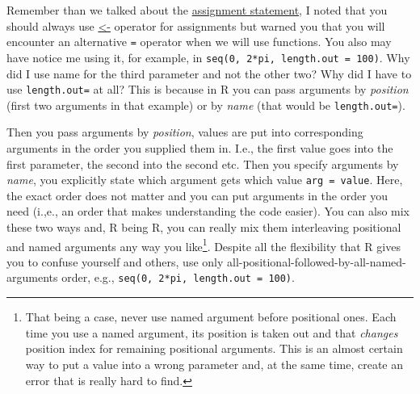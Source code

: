 \documentclass[
]{book}
\begin{document}
Remember than we talked about the \protect\hyperlink{assignment-statement}{assignment statement}, I noted that you should always use \href{https://stat.ethz.ch/R-manual/R-devel/library/base/html/assignOps.html}{\textless-} operator for assignments but warned you that you will encounter an alternative \texttt{=} operator when we will use functions. You also may have notice me using it, for example, in \texttt{seq(0,\ 2*pi,\ length.out\ =\ 100)}. Why did I use name for the third parameter and not the other two? Why did I have to use \texttt{length.out=} at all? This is because in R you can pass arguments by \emph{position} (first two arguments in that example) or by \emph{name} (that would be \texttt{length.out=}).

Then you pass arguments by \emph{position}, values are put into corresponding arguments in the order you supplied them in. I.e., the first value goes into the first parameter, the second into the second etc. Then you specify arguments by \emph{name}, you explicitly state which argument gets which value \texttt{arg\ =\ value}. Here, the exact order does not matter and you can put arguments in the order you need (i.,e., an order that makes understanding the code easier). You can also mix these two ways and, R being R, you can really mix them interleaving positional and named arguments any way you like\footnote{That being a case, never use named argument before positional ones. Each time you use a named argument, its position is taken out and that \emph{changes} position index for remaining positional arguments. This is an almost certain way to put a value into a wrong parameter and, at the same time, create an error that is really hard to find.}. Despite all the flexibility that R gives you to confuse yourself and others, use only all-positional-followed-by-all-named-arguments order, e.g., \texttt{seq(0,\ 2*pi,\ length.out\ =\ 100)}.
\end{document}
